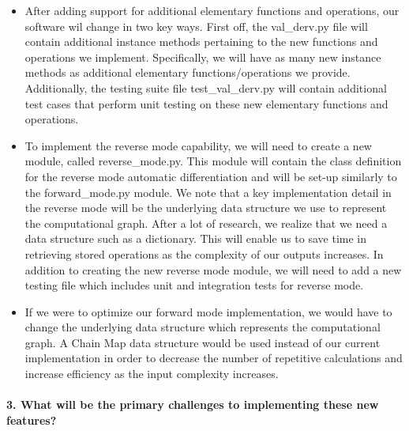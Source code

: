 \documentclass[11pt]{article}
\begin{document}
\begin{itemize}
\item
  After adding support for additional elementary functions and
  operations, our software wil change in two key ways. First off, the
  val\_derv.py file will contain additional instance methods pertaining
  to the new functions and operations we implement. Specifically, we
  will have as many new instance methods as additional elementary
  functions/operations we provide. Additionally, the testing suite file
  test\_val\_derv.py will contain additional test cases that perform
  unit testing on these new elementary functions and operations.
\item
  To implement the reverse mode capability, we will need to create a new
  module, called reverse\_mode.py. This module will contain the class
  definition for the reverse mode automatic differentiation and will be
  set-up similarly to the forward\_mode.py module. We note that a key
  implementation detail in the reverse mode will be the underlying data
  structure we use to represent the computational graph. After a lot of
  research, we realize that we need a data structure such as a
  dictionary. This will enable us to save time in retrieving stored
  operations as the complexity of our outputs increases. In addition to
  creating the new reverse mode module, we will need to add a new
  testing file which includes unit and integration tests for reverse
  mode.
\item
  If we were to optimize our forward mode implementation, we would have
  to change the underlying data structure which represents the
  computational graph. A Chain Map data structure would be used instead
  of our current implementation in order to decrease the number of
  repetitive calculations and increase efficiency as the input
  complexity increases.
\end{itemize}

\hypertarget{what-will-be-the-primary-challenges-to-implementing-these-new-features}{%
\paragraph{3. What will be the primary challenges to implementing these
new
features?}\label{what-will-be-the-primary-challenges-to-implementing-these-new-features}}
\end{document}
